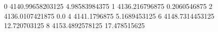 0 4140.99658203125 4.98583984375
1 4136.216796875 0.2060546875
2 4136.0107421875 0.0
4 4141.1796875 5.1689453125
6 4148.7314453125 12.720703125
8 4153.4892578125 17.478515625
